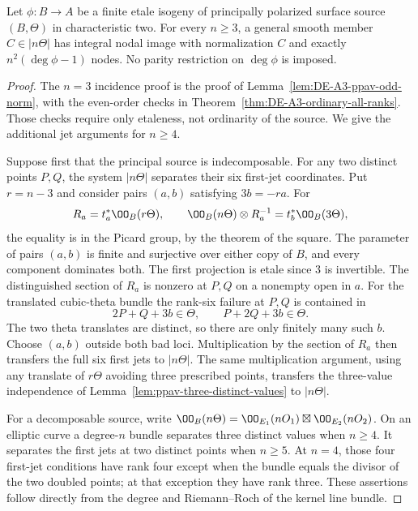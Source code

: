 \begin{lemma}
\label{lem:DE-A3-all-multiple-nodal-norm}
Let $\phi:B\to A$ be a finite etale isogeny of principally polarized
surface source $(B,\Theta)$ in characteristic two.  For every $n\ge3$,
a general smooth member $C\in|n\Theta|$ has integral nodal image
with normalization $C$ and exactly $n^2(\deg\phi-1)$ nodes.
No parity restriction on $\deg\phi$ is imposed.
\end{lemma}
\begin{proof}
The $n=3$ incidence proof is the proof of
Lemma~\ref{lem:DE-A3-ppav-odd-norm}, with the even-order checks in
Theorem~\ref{thm:DE-A3-ordinary-all-ranks}.  Those checks require
only etaleness, not ordinarity of the source.  We give the additional
jet arguments for $n\ge4$.

Suppose first that the principal source is indecomposable.  For any
two distinct points $P,Q$, the system $|n\Theta|$ separates their
six first-jet coordinates.  Put $r=n-3$ and consider pairs $(a,b)$
satisfying $3b=-ra$.  For
\[
 R_a=t_a^*\OO_B(r\Theta),\qquad
 \OO_B(n\Theta)\otimes R_a^{-1}=t_b^*\OO_B(3\Theta),
\]
the equality is in the Picard group, by the theorem of the square.
The parameter of pairs $(a,b)$ is finite and surjective over either
copy of $B$, and every component dominates both.  The first projection
is etale since $3$ is invertible.
The distinguished section of $R_a$ is nonzero at $P,Q$ on a nonempty
open in $a$.  For the translated cubic-theta bundle the rank-six
failure at $P,Q$ is contained in
\[
               2P+Q+3b\in\Theta,\qquad
               P+2Q+3b\in\Theta.
\]
The two theta translates are distinct, so there are only finitely
many such $b$.  Choose $(a,b)$ outside both bad loci.  Multiplication
by the section of $R_a$ then transfers the full six first jets to
$|n\Theta|$.  The same multiplication argument, using any translate
of $r\Theta$ avoiding three prescribed points, transfers the
three-value independence of Lemma~\ref{lem:ppav-three-distinct-values}
to $|n\Theta|$.

For a decomposable source, write
$\OO_B(n\Theta)=\OO_{E_1}(nO_1)\boxtimes\OO_{E_2}(nO_2)$.
On an elliptic curve a degree-$n$ bundle separates three distinct
values when $n\ge4$.  It separates the first jets at two distinct
points when $n\ge5$.  At $n=4$, those four first-jet conditions have
rank four except when the bundle equals the divisor of the two
doubled points; at that exception they have rank three.  These
assertions follow directly from the degree and Riemann--Roch of the
kernel line bundle.


\end{proof}
